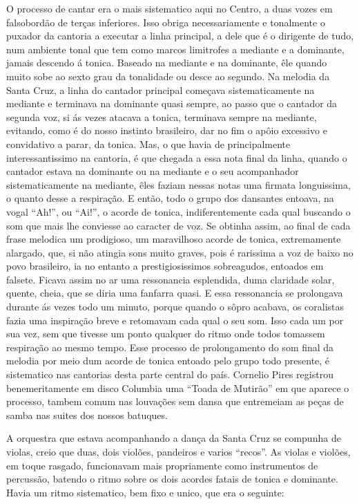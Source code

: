 O processo de cantar era o mais sistematico aqui no Centro, a duas vozes
em falsobordão de terças inferiores. Isso obriga necessariamente e
tonalmente o puxador da cantoria a executar a linha principal, a dele
que é o dirigente de tudo, num ambiente tonal que tem como marcos
limitrofes a mediante e a dominante, jamais descendo á tonica. Baseado
na mediante e na dominante, êle quando muito sobe ao sexto grau da
tonalidade ou desce ao segundo. Na melodia da Santa Cruz, a linha do
cantador principal começava sistematicamente na mediante e terminava na
dominante quasi sempre, ao passo que o cantador da segunda voz, si ás
vezes atacava a tonica, terminava sempre na mediante, evitando, como é
do nosso instinto brasileiro, dar no fim o apôio excessivo e convidativo
a parar, da tonica. Mas, o que havia de principalmente interessantissimo
na cantoria, é que chegada a essa nota final da linha, quando o cantador
estava na dominante ou na mediante e o seu acompanhador sistematicamente
na mediante, êles faziam nessas notas uma firmata longuissima, o quanto
desse a respiração. E então, todo o grupo dos dansantes entoava, na
vogal ``Ah!'', ou ``Ai!'', o acorde de tonica, indiferentemente cada
qual buscando o som que mais lhe conviesse ao caracter de voz. Se
obtinha assim, ao final de cada frase melodica um prodigioso, um
maravilhoso acorde de tonica, extremamente alargado, que, si não atingia
sons muito graves, pois é rarissima a voz de baixo no povo brasileiro,
ia no entanto a prestigiosissimos sobreagudos, entoados em falsete.
Ficava assim no ar uma ressonancia esplendida, duma claridade solar,
quente, cheia, que se diria uma fanfarra quasi. E essa ressonancia se
prolongava durante ás vezes todo um minuto, porque quando o sôpro
acabava, os coralistas fazia uma inspiração breve e retomavam cada qual
o seu som. Isso cada um por sua vez, sem que tivesse um ponto qualquer
do ritmo onde todos tomassem respiração ao mesmo tempo. Esse processo de
prolongamento do som final da melodia por meio dum acorde de tonica
entoado pelo grupo todo presente, é sistematico nas cantorias desta
parte central do país. Cornelio Pires registrou benemeritamente em disco
Columbia uma ``Toada de Mutirão'' em que aparece o processo, tambem
comum nas louvações sem dansa que entremeiam as peças de samba nas
suites dos nossos batuques.

A orquestra que estava acompanhando a dança da Santa Cruz se compunha de
violas, creio que duas, dois violões, pandeiros e varios ``recos''. As
violas e violões, em toque rasgado, funcionavam mais propriamente como
instrumentos de percussão, batendo o ritmo sobre os dois acordes fatais
de tonica e dominante. Havia um ritmo sistematico, bem fixo e unico, que
era o seguinte:


